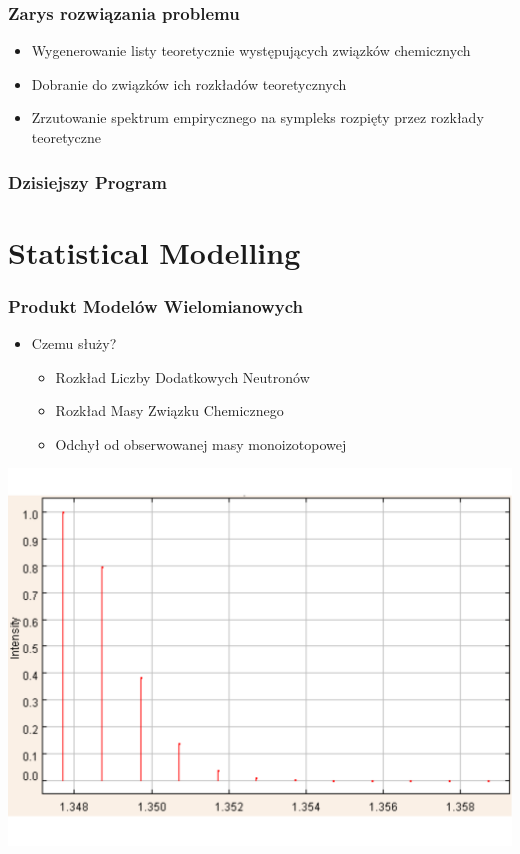 \documentclass[xetex]{beamer}
\begin{document}
	\begin{frame}\frametitle{Zarys rozwiązania problemu}
		\begin{itemize}
			\item 	Wygenerowanie listy teoretycznie występujących związków chemicznych
			\item  	Dobranie do związków ich rozkładów teoretycznych
			\item  	Zrzutowanie spektrum empirycznego na sympleks rozpięty przez rozkłady teoretyczne
		\end{itemize}
	\end{frame}


	\begin{frame}\frametitle{Dzisiejszy Program}
		\tableofcontents
	\end{frame}

\section[Model]{Statistical Modelling}
	\begin{frame}\frametitle{{\color{gray}Produkt} Model{\color{gray}ów} Wielomianowy{\color{gray}ch}}
		    
		\begin{itemize}
			\item Czemu służy?
			\begin{itemize}
				\item Rozkład Liczby Dodatkowych Neutronów
				\item Rozkład Masy Związku Chemicznego
				\item Odchył od obserwowanej masy monoizotopowej
			\end{itemize}
		\end{itemize}

		\begin{center}
			\includegraphics[height=.5\textheight, keepaspectratio]{./picts/realMassDistribution.pdf}
		\end{center}
	\end{frame}	
\end{document}
